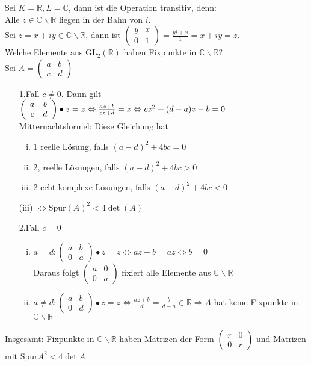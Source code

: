\documentclass{article}
\begin{document}
Sei $K = \mathbb{R}, L=\mathbb{C}$, dann ist die Operation transitiv, denn:\\
Alle $z\in\mathbb{C}\backslash\mathbb{R}$ liegen in der Bahn von $i$.\\
Sei $z=x+iy \in\mathbb{C}\backslash\mathbb{R}$, dann ist $\left(\begin{array}{cc}y & x\\0 & 1\end{array}\right) = \frac{yi+x}{1} = x+iy = z$.\\
Welche Elemente aus $\text{GL}_2(\mathbb{R})$ haben Fixpunkte in $\mathbb{C}\backslash\mathbb{R}$?\\
Sei $A=\left(\begin{array}{cc}a & b\\c & d\end{array}\right)$\begin{itemize}
\item[1.Fall] $c\neq 0$. Dann gilt $\left(\begin{array}{cc}a & b\\c & d\end{array}\right)\bullet z = z \Leftrightarrow \frac{az+b}{cz+d} = z\\
\Leftrightarrow cz^2 + (d-a)z -b = 0$\\
Mitternachtsformel: Diese Gleichung hat\begin{enumerate}[(i)]
\item 1 reelle Lösung, falls $(a-d)^2 + 4bc = 0$
\item 2, reelle Lösungen, falls $(a-d)^2 + 4bc > 0$
\item 2 echt komplexe Lösungen, falls $(a-d)^2 + 4bc < 0$
\end{enumerate}
(iii) $\Leftrightarrow \text{Spur}(A)^2 < 4\det(A)$
\item[2.Fall] $c=0$\begin{enumerate}[(i)]
\item $a=d : \left(\begin{array}{cc}a & b\\0 & a\end{array}\right)\bullet z = z \Leftrightarrow az+b=az\Leftrightarrow b=0$\\
Daraus folgt $\left(\begin{array}{cc}a & 0\\0 & a\end{array}\right)$ fixiert alle Elemente aus $\mathbb{C}\backslash\mathbb{R}$
\item $a\neq d: \left(\begin{array}{cc}a & b \\0 & d\end{array}\right)\bullet z = z \Leftrightarrow \frac{az+b}d = \frac{b}{d-a}\in\mathbb{R}\Rightarrow A$ hat keine Fixpunkte in $\mathbb{C}\backslash\mathbb{R}$\\
\end{enumerate}
\end{itemize}
Insgesamt: Fixpunkte in $\mathbb{C}\backslash\mathbb{R}$ haben Matrizen der Form $\left(\begin{array}{cc}r & 0\\0 & r\end{array}\right)$ und Matrizen mit $\text{Spur}A^2<4\det A$
\end{document}
